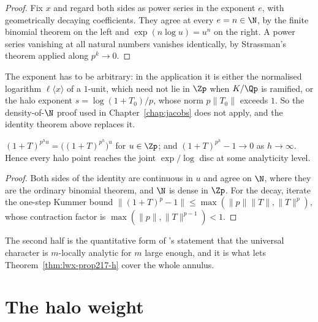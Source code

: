 \begin{proof}
  \leanok
  Fix $x$ and regard both sides as power series in the exponent $e$, with geometrically decaying
  coefficients.  They agree at every $e = n \in \N$, by the finite binomial theorem on the left
  and $\exp(n\log u) = u^{n}$ on the right.  A power series vanishing at all natural numbers
  vanishes identically, by Strassman's theorem applied along $p^{k}\to 0$.
\end{proof}

The exponent has to be arbitrary: in the application it is either the normalised logarithm
$\ell\langle x\rangle$ of a $1$-unit, which need not lie in $\Zp$ when $K/\Qp$ is ramified, or
the halo exponent $s = \log(1+T_0)/p$, whose norm $p\lVert T_0\rVert$ exceeds $1$.  So the
density-of-$\N$ proof used in Chapter~\ref{chap:jacobs} does not apply, and the identity theorem
above replaces it.

\begin{lemma}
  \label{lem:pow-sub-one}
  \leanok
  $(1+T)^{p^{h}u} = \bigl((1+T)^{p^{h}}\bigr)^{u}$ for $u\in\Zp$; and
  $(1+T)^{p^{h}} - 1 \to 0$ as $h\to\infty$.  Hence every halo point reaches the joint
  $\exp/\log$ disc at some analyticity level.
\end{lemma}

\begin{proof}
  \leanok
  Both sides of the identity are continuous in $u$ and agree on $\N$, where they are the ordinary
  binomial theorem, and $\N$ is dense in $\Zp$.  For the decay, iterate the one-step Kummer bound
  $\lVert (1+T)^{p}-1\rVert \leq \max(\lVert p\rVert\lVert T\rVert, \lVert T\rVert^{p})$, whose
  contraction factor is $\max(\lVert p\rVert, \lVert T\rVert^{p-1})<1$.
\end{proof}

The second half is the quantitative form of \cite[\S2.7]{LWX}'s statement that the universal
character is $m$-locally analytic for $m$ large enough, and it is what lets
Theorem~\ref{thm:lwx-prop217-h} cover the whole annulus.

\section{The halo weight}
\label{sec:haloweight}

